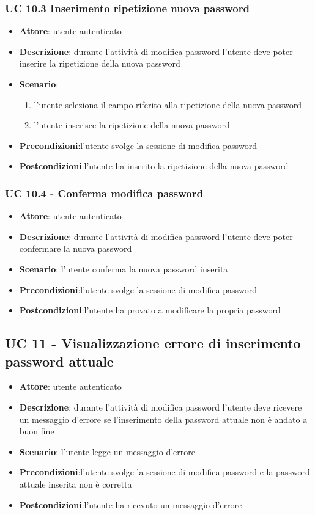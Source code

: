 \subsubsection{UC 10.3 Inserimento ripetizione nuova password}
\begin{itemize}
    \item \textbf{Attore}: utente autenticato
    \item \textbf{Descrizione}: durante l’attività di modifica password l’utente deve poter inserire la ripetizione della nuova password
    \item \textbf{Scenario}: 
        \begin{enumerate}
            \item l’utente seleziona il campo riferito alla ripetizione della nuova password
            \item l’utente inserisce la ripetizione della nuova password 
        \end{enumerate}
    \item \textbf{Precondizioni}:l’utente svolge la sessione di modifica password
    \item \textbf{Postcondizioni}:l’utente ha inserito la ripetizione della nuova password 
\end{itemize}

\subsubsection{UC 10.4 - Conferma modifica password}
\begin{itemize}
    \item \textbf{Attore}: utente autenticato
    \item \textbf{Descrizione}: durante l’attività di modifica password l’utente deve poter confermare la nuova password
    \item \textbf{Scenario}: l’utente conferma la nuova password inserita
    \item \textbf{Precondizioni}:l’utente svolge la sessione di modifica password
    \item \textbf{Postcondizioni}:l’utente ha provato a modificare la propria password
\end{itemize}

\subsection{UC 11 - Visualizzazione errore di inserimento password attuale}
\begin{itemize}
    \item \textbf{Attore}: utente autenticato
    \item \textbf{Descrizione}: durante l’attività di modifica password l’utente deve ricevere un messaggio d’errore se l'inserimento della password attuale non è andato a buon fine
    \item \textbf{Scenario}: l’utente legge un messaggio d’errore
    \item \textbf{Precondizioni}:l’utente svolge la sessione di modifica password e la password attuale inserita non è corretta
    \item \textbf{Postcondizioni}:l’utente ha ricevuto un messaggio d’errore
\end{itemize}

